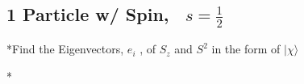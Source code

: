 \documentclass[12pt]{article}
\begin{document}
\subsection{1 Particle w/ Spin, \ \(s = \frac{1}{2}\)}
*Find the Eigenvectors, \(e_i\) , of \(S_z\) and \(S^2\) in the form of \(|\chi\rangle\)

\vspace{5pt}
\begin{center}
    \setlength{\parindent}{.5cm}
    \noindent
    * 
\end{center}
\end{document}

